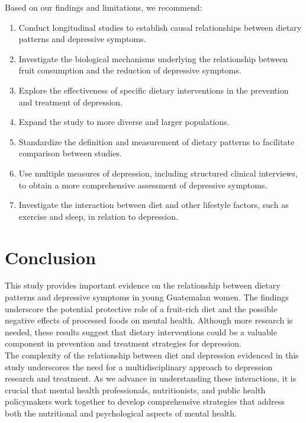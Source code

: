 \documentclass[jou]{apa7}
\begin{document}
Based on our findings and limitations, we recommend:
\begin{enumerate}
	\item Conduct longitudinal studies to establish causal relationships between dietary patterns and depressive symptoms.
	\item Investigate the biological mechanisms underlying the relationship between fruit consumption and the reduction of depressive symptoms.
	\item Explore the effectiveness of specific dietary interventions in the prevention and treatment of depression.
	\item Expand the study to more diverse and larger populations.
	\item Standardize the definition and measurement of dietary patterns to facilitate comparison between studies.
	\item Use multiple measures of depression, including structured clinical interviews, to obtain a more comprehensive assessment of depressive symptoms.
	\item Investigate the interaction between diet and other lifestyle factors, such as exercise and sleep, in relation to depression.
\end{enumerate}

\section{Conclusion}\label{conclusiuxf3n}

This study provides important evidence on the relationship between dietary patterns and depressive symptoms in young Guatemalan women. The findings underscore the potential protective role of a fruit-rich diet and the possible negative effects of processed foods on mental health. Although more research is needed, these results suggest that dietary interventions could be a valuable component in prevention and treatment strategies for depression.\\

The complexity of the relationship between diet and depression evidenced in this study underscores the need for a multidisciplinary approach to depression research and treatment. As we advance in understanding these interactions, it is crucial that mental health professionals, nutritionists, and public health policymakers work together to develop comprehensive strategies that address both the nutritional and psychological aspects of mental health.






\printbibliography
\end{document}

